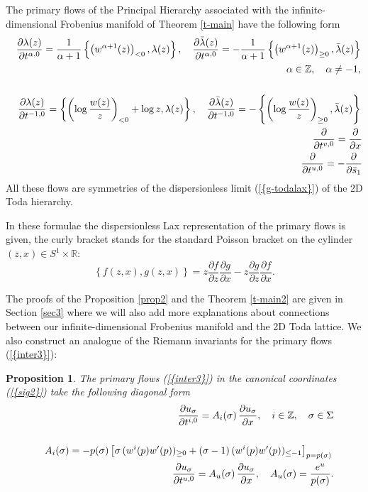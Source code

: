 \documentclass[numbook, envcountsame, envcountreset]{svjour3}
\newtheorem{prop}[theorem]{Proposition}
\begin{document}
\begin{theorem}\label{t-main2}
The primary flows of the Principal Hierarchy associated with the infinite-dimensional Frobenius manifold of Theorem \ref{t-main} have the following form
\begin{eqnarray}\label{inter3}
&&
\frac{{\partial} \lambda(z)}{{\partial} t^{\alpha,0}} =\frac1{\alpha+1} \left\{ \left(w^{\alpha+1}(z)\right)_{<0}, \lambda(z) \right\}, \quad \frac{{\partial} \bar\lambda(z)}{{\partial} t^{\alpha,0}} =-\frac1{\alpha+1} \left\{ \left(w^{\alpha+1}(z)\right)_{\geq 0}, \bar\lambda(z) \right\}
{\nonumber}\\
&&
 \alpha \in \mathbb Z, \quad \alpha\neq -1,
{\nonumber}\\
&&
\\
 &&
\frac{{\partial} \lambda(z)}{{\partial} t^{-1,0}}= \left\{\left( \log\frac{w(z)}{z}\right)_{<0}+ \log z ,\lambda(z)\right\}, \quad \frac{{\partial} \bar\lambda(z)}{{\partial} t^{-1,0}}=-\left\{ \left( \log\frac{w(z)}{z}\right)_{\geq 0}, \bar\lambda(z)\right\}
{\nonumber}\\
&&
\frac{\partial}{{\partial} t^{v,0}}=\frac{\partial}{{\partial} x}
{\nonumber}\\
&&
\frac{\partial}{{\partial} t^{u,0}}=-\frac{\partial}{{\partial} \bar s_1}
{\nonumber}
\end{eqnarray}
All these flows are symmetries of the dispersionless limit {(\ref{{g-todalax}})} of the 2D Toda hierarchy.
\end{theorem} 

In these formulae the dispersionless Lax representation of the primary flows is given, the curly bracket stands for the standard Poisson bracket on the cylinder $(z,x)\in S^1 \times \mathbb R$:
$$
\left\{ f(z,x), g(z,x)\right\} =  z \frac{{\partial} f}{{\partial} z} \frac{{\partial} g}{{\partial} x} - z \frac{{\partial} g}{{\partial} z} \frac{{\partial} f}{{\partial} x}.
$$

The proofs of the Proposition \ref{prop2} and the Theorem \ref{t-main2} are given in Section \ref{sec3} where  we will also add more explanations about connections between our infinite-dimensional Frobenius manifold and the 2D Toda lattice. We also construct an analogue of the Riemann invariants for the primary flows {(\ref{{inter3}})}:

\begin{prop} \label{prop3} The primary flows {(\ref{{inter3}})} in the canonical coordinates {(\ref{{sig2}})} take the following diagonal form
\begin{eqnarray}\label{riem}
&&
\frac{{\partial} u_\sigma}{{\partial} t^{i,0}} =A_i(\sigma)\, \frac{{\partial} u_\sigma}{{\partial} x},\quad i\in \mathbb Z, \quad \sigma\in \Sigma
{\nonumber}\\
&&
\\
&&
A_i(\sigma) = -p(\sigma)\left[ \sigma\, (w^i(p) w'(p))_{\geq 0} +(\sigma-1)\, (w^i(p) w'(p))_{\leq -1}\right]_{p=p(\sigma)}
{\nonumber}\\
&&
\frac{{\partial} u_\sigma}{{\partial} t^{u,0}} =A_u(\sigma)\, \frac{{\partial} u_\sigma}{{\partial} x}, \quad A_u(\sigma) =\frac{e^u}{p(\sigma)}.
{\nonumber}
\end{eqnarray}
\end{prop}
\end{document}
